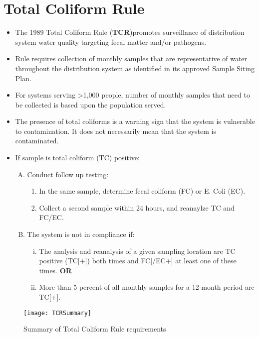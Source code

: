 \section{Total Coliform Rule}
\begin{itemize}
\item The 1989 Total Coliform Rule (\textbf{TCR})promotes surveillance of distribution system water quality targeting fecal matter and/or pathogens.
\item Rule requires collection of monthly samples that are representative of water throughout the distribution system as identified in its approved Sample Siting Plan.
\item For systems serving >1,000 people, number of monthly samples that need to be collected is based upon the population served.  
\item The presence of total coliforms is a warning sign that the system is vulnerable to contamination. It does not necessarily mean that the system is contaminated.
\item If sample is total coliform (TC) positive:
\begin{enumerate}[A.]
\item Conduct follow up testing:
\begin{enumerate}[1.]
\item In the same sample, determine fecal coliform (FC) or E. Coli (EC).
\item Collect a second sample within 24 hours, and reanaylze TC and FC/EC. 
\end{enumerate}
\item The system is not in compliance if:
\begin{enumerate}[i.]
\item The analysis and reanalysis of a given sampling location are TC positive (TC[+]) both times and FC[/EC+] at least one of these times. \textbf{OR}
\item More than 5 percent of all monthly samples for a 12-month period are TC[+].
\end{enumerate}
\end{enumerate}

\end{itemize}

\begin{figure}[]
\begin{center}
\texttt{[image: TCRSummary]}
\caption{Summary of Total Coliform Rule requirements}
\end{center}
\end{figure}




